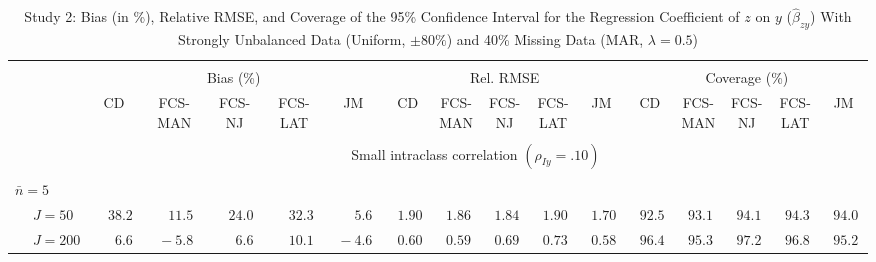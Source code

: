 \begin{sidewaystable}
\begin{threeparttable}
\setlength{\tabcolsep}{1.0pt}
\renewcommand{\arraystretch}{0.95}
\footnotesize
\caption{\small Study 2: Bias (in \%), Relative RMSE, and Coverage of the 95\% Confidence Interval for the Regression Coefficient of $z$ on $y$ ($\hat\beta_{zy}$) With Strongly Unbalanced Data (Uniform, $\pm 80\%$) and 40\% Missing Data (MAR, $\lambda=0.5$)}
\begin{tabular}{llccccccccccccccc}
\hline\\[-1.8ex]
& & \multicolumn{5}{c}{Bias (\%)} & \multicolumn{5}{c}{Rel. RMSE} & \multicolumn{5}{c}{Coverage (\%)} \\ \cmidrule(r){3-7}\cmidrule(r){8-12}\cmidrule(r){13-17}
 &  & CD & \makecell{FCS-\\MAN} & \makecell{FCS-\\NJ} & \makecell{FCS-\\LAT} & JM & CD & \makecell{FCS-\\MAN} & \makecell{FCS-\\NJ} & \makecell{FCS-\\LAT} & JM & CD & \makecell{FCS-\\MAN} & \makecell{FCS-\\NJ} & \makecell{FCS-\\LAT} & \multicolumn{1}{c}{JM} \\ 
[0.4ex]\hline\\[-1.8ex]
& & \multicolumn{15}{c}{Small intraclass correlation $(\rho_{Iy}=.10)$} \\[0.6ex]\hline\\[-1.8ex]
\multicolumn{4}{l}{$\bar{n}=5$} \\  & \nopagebreak $\;J=50$  & $\phantom{-}38.2\phantom{0}$ & $\phantom{-}11.5\phantom{0}$ & $\phantom{-}24.0\phantom{0}$ & $\phantom{-}32.3\phantom{0}$ & $\phantom{0}\phantom{-}5.6\phantom{0}$ & $\phantom{0}1.90\phantom{0}$ & $\phantom{0}1.86\phantom{0}$ & $\phantom{0}1.84\phantom{0}$ & $\phantom{0}1.90\phantom{0}$ & $\phantom{0}1.70\phantom{0}$ & $\phantom{0}92.5\phantom{0}$ & $\phantom{0}93.1\phantom{0}$ & $\phantom{0}94.1\phantom{0}$ & $\phantom{0}94.3\phantom{0}$ & $\phantom{0}94.0\phantom{0}$ \\
 & \nopagebreak $\;J=200$  & $\phantom{0}\phantom{-}6.6\phantom{0}$ & $\phantom{0}{-}5.8\phantom{0}$ & $\phantom{0}\phantom{-}6.6\phantom{0}$ & $\phantom{-}10.1\phantom{0}$ & $\phantom{0}{-}4.6\phantom{0}$ & $\phantom{0}0.60\phantom{0}$ & $\phantom{0}0.59\phantom{0}$ & $\phantom{0}0.69\phantom{0}$ & $\phantom{0}0.73\phantom{0}$ & $\phantom{0}0.58\phantom{0}$ & $\phantom{0}96.4\phantom{0}$ & $\phantom{0}95.3\phantom{0}$ & $\phantom{0}97.2\phantom{0}$ & $\phantom{0}96.8\phantom{0}$ & $\phantom{0}95.2\phantom{0}$ \\

\end{tabular}
\end{threeparttable}
\end{sidewaystable}
